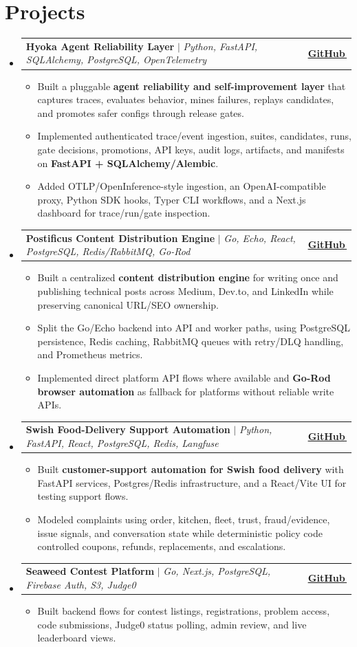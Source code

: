 \documentclass[letterpaper,11pt]{article}
\makeatletter
\newcommand{\bodyhref}[2]{\href{#1}{\underline{#2}\,\faExternalLink*}}
\newcommand{\resumeItem}[1]{\item{\fontsize{8.82pt}{9.28pt}\selectfont #1\vspace{-0.7pt}}}
\newcommand{\resumeProjectHeading}[2]{
    \item
    \begin{tabular*}{1.0\textwidth}{l@{\extracolsep{\fill}}r}
      \small#1 & \textbf{\small #2}\\
    \end{tabular*}\vspace{-4pt}
}
\newcommand{\resumeSubHeadingListStart}{\begin{itemize}[leftmargin=0.0in, label={}, itemsep=0.6pt, topsep=0pt, parsep=0pt, partopsep=0pt]}
\newcommand{\resumeSubHeadingListEnd}{\end{itemize}}
\newcommand{\resumeItemListStart}{\begin{itemize}[leftmargin=0.16in,itemsep=0.3pt,topsep=0.9pt,parsep=0pt,partopsep=0pt]}
\newcommand{\resumeItemListEnd}{\end{itemize}\vspace{-3pt}}
\makeatother
\begin{document}
\section{Projects}
\resumeSubHeadingListStart
\resumeProjectHeading
{\textbf{Hyoka Agent Reliability Layer} $|$ \emph{Python, FastAPI, SQLAlchemy, PostgreSQL, OpenTelemetry}}{\bodyhref{https://github.com/unichronic/hyoka}{GitHub}}
\resumeItemListStart
\resumeItem{Built a pluggable \textbf{agent reliability and self-improvement layer} that captures traces, evaluates behavior, mines failures, replays candidates, and promotes safer configs through release gates.}
\resumeItem{Implemented authenticated trace/event ingestion, suites, candidates, runs, gate decisions, promotions, API keys, audit logs, artifacts, and manifests on \textbf{FastAPI + SQLAlchemy/Alembic}.}
\resumeItem{Added OTLP/OpenInference-style ingestion, an OpenAI-compatible proxy, Python SDK hooks, Typer CLI workflows, and a Next.js dashboard for trace/run/gate inspection.}
\resumeItemListEnd
\resumeProjectHeading
{\textbf{Postificus Content Distribution Engine} $|$ \emph{Go, Echo, React, PostgreSQL, Redis/RabbitMQ, Go-Rod}}{\bodyhref{https://github.com/unichronic/postificus}{GitHub}}
\resumeItemListStart
\resumeItem{Built a centralized \textbf{content distribution engine} for writing once and publishing technical posts across Medium, Dev.to, and LinkedIn while preserving canonical URL/SEO ownership.}
\resumeItem{Split the Go/Echo backend into API and worker paths, using PostgreSQL persistence, Redis caching, RabbitMQ queues with retry/DLQ handling, and Prometheus metrics.}
\resumeItem{Implemented direct platform API flows where available and \textbf{Go-Rod browser automation} as fallback for platforms without reliable write APIs.}
\resumeItemListEnd
\resumeProjectHeading
{\textbf{Swish Food-Delivery Support Automation} $|$ \emph{Python, FastAPI, React, PostgreSQL, Redis, Langfuse}}{\bodyhref{https://github.com/unichronic/swishagent}{GitHub}}
\resumeItemListStart
\resumeItem{Built \textbf{customer-support automation for Swish food delivery} with FastAPI services, Postgres/Redis infrastructure, and a React/Vite UI for testing support flows.}
\resumeItem{Modeled complaints using order, kitchen, fleet, trust, fraud/evidence, issue signals, and conversation state while deterministic policy code controlled coupons, refunds, replacements, and escalations.}
\resumeItemListEnd
\resumeProjectHeading
{\textbf{Seaweed Contest Platform} $|$ \emph{Go, Next.js, PostgreSQL, Firebase Auth, S3, Judge0}}{\bodyhref{https://github.com/unichronic/seaweed-fe}{GitHub}}
\resumeItemListStart
\resumeItem{Built backend flows for contest listings, registrations, problem access, code submissions, Judge0 status polling, admin review, and live leaderboard views.}
\resumeItemListEnd
\resumeSubHeadingListEnd
\end{document}
